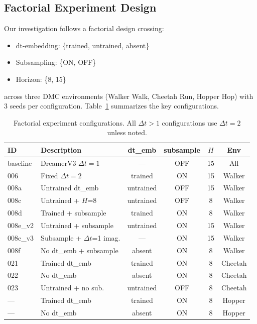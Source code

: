 \documentclass[10pt,letterpaper]{article}
\newcommand{\dt}{\Delta t}
\begin{document}
\subsection{Factorial Experiment Design}

Our investigation follows a factorial design crossing:
\begin{itemize}[nosep]
  \item dt-embedding: \{trained, untrained, absent\}
  \item Subsampling: \{ON, OFF\}
  \item Horizon: \{8, 15\}
\end{itemize}
across three DMC environments (Walker Walk, Cheetah Run, Hopper Hop) with 3 seeds per configuration.
Table~\ref{tab:configs} summarizes the key configurations.

\begin{table}[t]
\centering
\caption{Factorial experiment configurations. All $\dt>1$ configurations use $\dt=2$ unless noted.}
\label{tab:configs}
\small
\begin{tabular}{llcccc}
\toprule
ID & Description & dt\_emb & subsample & $H$ & Env \\
\midrule
baseline & DreamerV3 $\dt=1$ & --- & OFF & 15 & All \\
006 & Fixed $\dt=2$ & trained & ON & 15 & Walker \\
008a & Untrained dt\_emb & untrained & OFF & 15 & Walker \\
008c & Untrained + $H$=8 & untrained & OFF & 8 & Walker \\
008d & Trained + subsample & trained & ON & 8 & Walker \\
008e\_v2 & Untrained + subsample & untrained & ON & 15 & Walker \\
008e\_v3 & Subsample + $\dt$=1 imag. & --- & ON & 15 & Walker \\
008f & No dt\_emb + subsample & absent & ON & 8 & Walker \\
021 & Trained dt\_emb & trained & ON & 8 & Cheetah \\
022 & No dt\_emb & absent & ON & 8 & Cheetah \\
023 & Untrained + no sub. & untrained & OFF & 8 & Cheetah \\
--- & Trained dt\_emb & trained & ON & 8 & Hopper \\
--- & No dt\_emb & absent & ON & 8 & Hopper \\
\bottomrule
\end{tabular}
\end{table}
\end{document}
